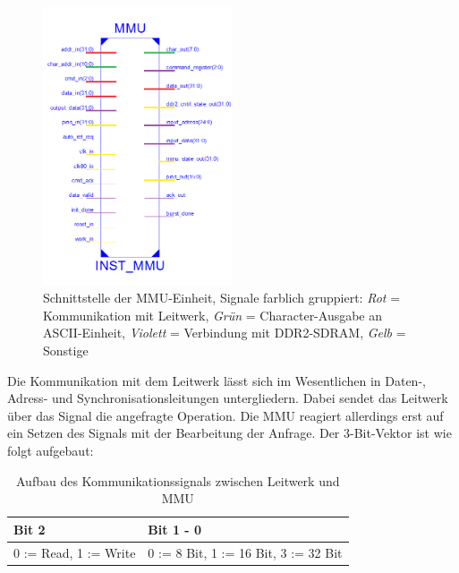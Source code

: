 \begin{figure}[H]
	\label{fig:mmuinterface}
	\centering
		\includegraphics[width=0.5\textwidth]{interface.png}
	\caption[Schnittstelle der MMU-Einheit]{Schnittstelle der MMU-Einheit, Signale farblich gruppiert: \textit{Rot} = Kommunikation mit Leitwerk, \textit{Gr\"un} = Character-Ausgabe an ASCII-Einheit, \textit{Violett} = Verbindung mit DDR2-SDRAM, \textit{Gelb} = Sonstige}
\end{figure}


Die Kommunikation mit dem Leitwerk l\"asst sich im Wesentlichen in Daten-, Adress- und Synchronisationsleitungen untergliedern. Dabei sendet das Leitwerk \"uber das Signal  die angefragte Operation. Die MMU reagiert allerdings erst auf ein Setzen des  Signals mit der Bearbeitung der Anfrage. Der 3-Bit-Vektor  ist wie folgt aufgebaut:

\begin{table}
\begin{center}

	\begin{tabular}{| l | l |}
		\hline
		Bit 2 & Bit 1 - 0 \\ \hline
		0 := Read, 1 := Write & 0 := 8 Bit, 1 := 16 Bit, 3 := 32 Bit \\ 		\hline
	\end{tabular}
	\caption{Aufbau des Kommunikationssignals zwischen Leitwerk und MMU}
\end{center}
\end{table}

